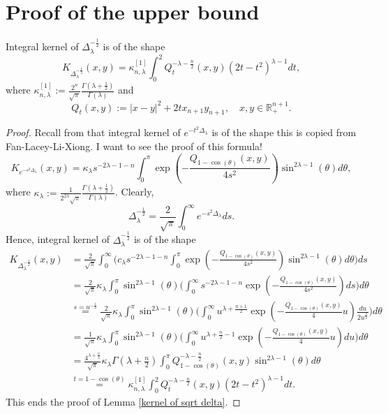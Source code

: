 \documentclass[12pt]{amsart}
\begin{document}
\section{Proof of the upper bound}\label{upper bound section}
\setcounter{equation}{0}
\begin{lemma}\label{kernel of sqrt delta} Integral kernel of $\Delta_{\lambda}^{-\frac12}$ is of the shape
$$K_{\Delta_{\lambda}^{-\frac12}}(x,y)=\kappa_{n,\lambda}^{[1]}\int_0^2Q_t^{-\lambda-\frac{n}{2}}(x,y)(2t-t^2)^{\lambda-1}dt,$$
where $\kappa_{n,\lambda}^{[1]}:=\frac{2^n}{\sqrt{\pi}}\frac{\Gamma(\lambda+\frac{1}{2})}{\Gamma(\lambda)}$ and
$$Q_t(x,y):=|x-y|^2+2tx_{n+1}y_{n+1},\quad x,y\in\mathbb{R}^{n+1}_+.$$
\end{lemma}
\begin{proof} Recall from \cite[formula (2.11)]{FLLXarxiv} that integral kernel of $e^{-t^2\Delta_{\lambda}}$ is of the shape {\color{red} this is copied from Fan-Lacey-Li-Xiong. I want to see the proof of this formula!}
$$K_{e^{-s^2\Delta_{\lambda}}}(x,y)=\kappa_{\lambda}s^{-2\lambda-1-n}\int_0^{\pi}\exp(-\frac{Q_{1-\cos(\theta)}(x,y)}{4s^2})\sin^{2\lambda-1}(\theta)d\theta,$$
where $\kappa_\lambda:=\frac{1}{2^{2\lambda}\sqrt{\pi}}\frac{\Gamma(\lambda+\frac{1}{2})}{\Gamma(\lambda)}$. Clearly,
$$\Delta_{\lambda}^{-\frac12}=\frac{2}{\sqrt{\pi}}\int_0^{\infty}e^{-s^2\Delta_{\lambda}}ds.$$
Hence, integral kernel of $\Delta_{\lambda}^{-\frac12}$ is of the shape
\begin{align*}
K_{\Delta_{\lambda}^{-\frac12}}(x,y)&=\frac{2}{\sqrt{\pi}}\int_0^{\infty}\Big(c_{\lambda}s^{-2\lambda-1-n}\int_0^{\pi}\exp(-\frac{Q_{1-\cos(\theta)}(x,y)}{4s^2})\sin^{2\lambda-1}(\theta)d\theta\Big)ds\\
&=\frac{2}{\sqrt{\pi}}\kappa_{\lambda}\int_0^{\pi}\sin^{2\lambda-1}(\theta)\Big(\int_0^{\infty}s^{-2\lambda-1-n}\exp(-\frac{Q_{1-\cos(\theta)}(x,y)}{4s^2})ds\Big)d\theta\\
&\stackrel{s=u^{-\frac12}}{=}\frac{2}{\sqrt{\pi}}\kappa_{\lambda}\int_0^{\pi}\sin^{2\lambda-1}(\theta)\Big(\int_0^{\infty}u^{\lambda+\frac{n+1}{2}}\exp(-\frac{Q_{1-\cos(\theta)}(x,y)}{4}u)\frac{du}{2u^{\frac32}}\Big)d\theta\\
&=\frac1{\sqrt{\pi}}\kappa_{\lambda}\int_0^{\pi}\sin^{2\lambda-1}(\theta)\Big(\int_0^{\infty}u^{\lambda+\frac{n}{2}-1}\exp(-\frac{Q_{1-\cos(\theta)}(x,y)}{4}u)du\Big)d\theta\\
&=\frac{4^{\lambda+\frac{n}{2}}}{\sqrt{\pi}}\kappa_{\lambda}\Gamma(\lambda+\frac{n}{2})\int_0^{\pi}Q_{1-\cos(\theta)}^{-\lambda-\frac{n}{2}}(x,y)\sin^{2\lambda-1}(\theta)d\theta\\
&\stackrel{t=1-\cos(\theta)}{=}\kappa_{n,\lambda}^{[1]}\int_0^2Q_t^{-\lambda-\frac{n}{2}}(x,y)(2t-t^2)^{\lambda-1}dt.
\end{align*}
This ends the proof of Lemma \ref{kernel of sqrt delta}.
\end{proof}
\end{document}
